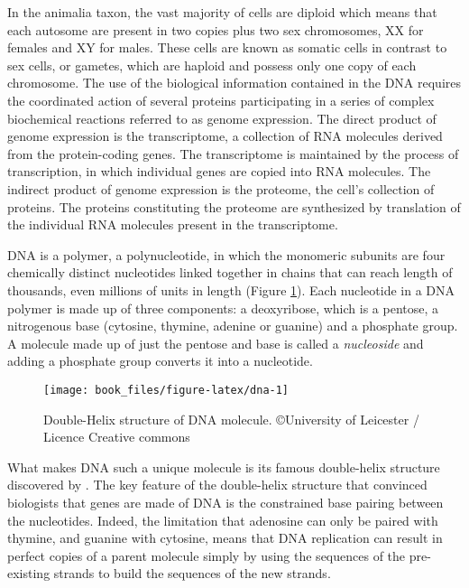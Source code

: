 \documentclass[]{book}
\begin{document}
In the animalia taxon, the vast majority of cells are diploid which
means that each autosome are present in two copies plus two sex
chromosomes, XX for females and XY for males. These cells are known as
somatic cells in contrast to sex cells, or gametes, which are haploid
and possess only one copy of each chromosome. The use of the biological
information contained in the DNA requires the coordinated action of
several proteins participating in a series of complex biochemical
reactions referred to as genome expression. The direct product of genome
expression is the transcriptome, a collection of RNA molecules derived
from the protein-coding genes. The transcriptome is maintained by the
process of transcription, in which individual genes are copied into RNA
molecules. The indirect product of genome expression is the proteome,
the cell's collection of proteins. The proteins constituting the
proteome are synthesized by translation of the individual RNA molecules
present in the transcriptome.

DNA is a polymer, a polynucleotide, in which the monomeric subunits are
four chemically distinct nucleotides linked together in chains that can
reach length of thousands, even millions of units in length (Figure
\ref{fig:dna}). Each nucleotide in a DNA polymer is made up of three
components: a deoxyribose, which is a pentose, a nitrogenous base
(cytosine, thymine, adenine or guanine) and a phosphate group. A
molecule made up of just the pentose and base is called a \emph{nucleoside}
and adding a phosphate group converts it into a nucleotide.



\begin{figure}

{\centering \texttt{[image: book\_files/figure-latex/dna-1]} 

}

\caption{Double-Helix structure of DNA molecule. \copyright University of Leicester / Licence Creative commons}\label{fig:dna}
\end{figure}

What makes DNA such a unique molecule is its famous double-helix
structure discovered by \citep{crick_watson_prsl1954}. The key feature of the
double-helix structure that convinced biologists that genes are made of
DNA is the constrained base pairing between the nucleotides. Indeed, the
limitation that adenosine can only be paired with thymine, and guanine
with cytosine, means that DNA replication can result in perfect copies
of a parent molecule simply by using the sequences of the pre-existing
strands to build the sequences of the new strands.
\end{document}
